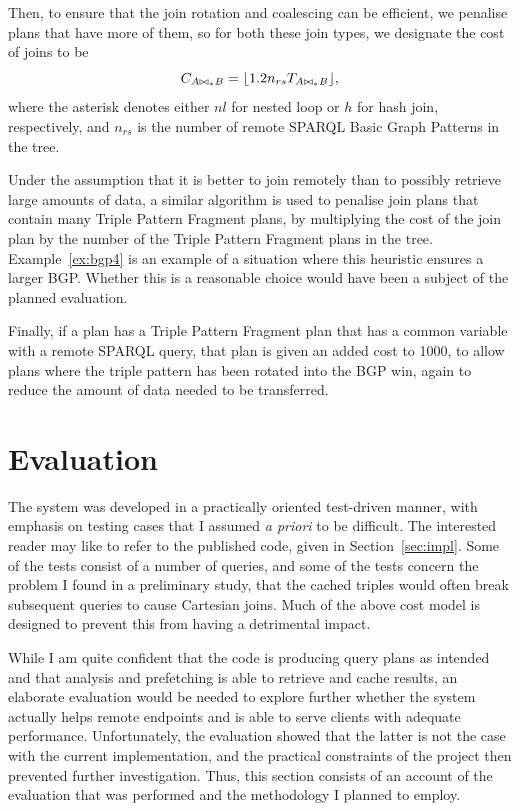 Then, to ensure that the join rotation and coalescing can be
efficient, we penalise plans that have more of them, so
for both these join types, we designate the cost of joins to be
\begin{equation}\label{eq:cjoins}
C_{A \bowtie_* B} = \lfloor  1.2 n_{rs} T_{A \bowtie_{*} B}  \rfloor ,
\end{equation}
where the asterisk denotes either $nl$ for nested loop or $h$ for hash
join, respectively, and $n_{rs}$ is the number of remote SPARQL Basic
Graph Patterns in the tree.

Under the assumption that it is better to join remotely than to
possibly retrieve large amounts of data, a similar algorithm is used
to penalise join plans that contain many Triple Pattern Fragment
plans, by multiplying the cost of the join plan by the number of the
Triple Pattern Fragment plans in the tree. Example~\ref{ex:bgp4} is an
example of a situation where this heuristic ensures a larger
BGP. Whether this is a reasonable choice would have been a subject of
the planned evaluation.

Finally, if a plan has a Triple Pattern Fragment plan that has a
common variable with a remote SPARQL query, that plan is given an
added cost to 1000, to allow plans where the triple pattern has been
rotated into the BGP win, again to reduce the amount of data needed to
be transferred.

\section{Evaluation}

The system was developed in a practically oriented test-driven manner,
with emphasis on testing cases that I assumed \textit{a priori} to be
difficult. The interested reader may like to refer to the published code,
given in Section~\ref{sec:impl}. Some of the tests consist of a number
of queries, and some of the tests concern the problem I found in a
preliminary study, that the cached triples would often break
subsequent queries to cause Cartesian joins. Much of the above cost
model is designed to prevent this from having a detrimental impact.

While I am quite confident that the code is producing query plans as
intended and that analysis and prefetching is able to retrieve and
cache results, an elaborate evaluation would be needed to explore
further whether the system actually helps remote endpoints and is able
to serve clients with adequate performance. Unfortunately, the
evaluation showed that the latter is not the case with the current
implementation, and the practical constraints of the project then
prevented further investigation. Thus, this section consists of an
account of the evaluation that was performed and the methodology I
planned to employ.

